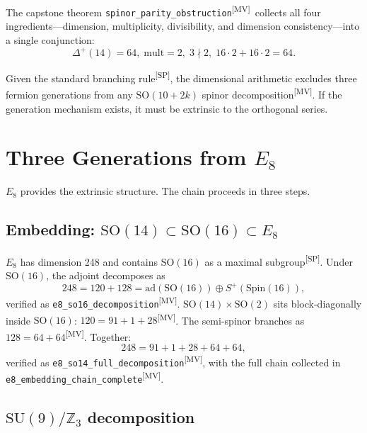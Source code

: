 \documentclass[aps,prl,twocolumn,showpacs,preprintnumbers,superscriptaddress,floatfix]{revtex4-2}
\newcommand{\ad}{\mathrm{ad}}
\newcommand{\MV}{\textsuperscript{[MV]}}
\newcommand{\SP}{\textsuperscript{[SP]}}
\begin{document}
The capstone theorem \texttt{spinor\_parity\_obstruction}\MV\
collects all four ingredients---dimension, multiplicity, divisibility,
and dimension consistency---into a single conjunction:
\begin{equation}
  \Delta^+(14) = 64,\;
  \mathrm{mult} = 2,\;
  3 \nmid 2,\;
  16 \cdot 2 + 16 \cdot 2 = 64.
  \label{eq:capstone-obs}
\end{equation}

Given the standard branching rule\SP, the dimensional arithmetic
excludes three fermion generations from any
$\mathrm{SO}(10{+}2k)$ spinor decomposition\MV.  If the
generation mechanism exists, it must be extrinsic to the
orthogonal series.

\section{Three Generations from $E_8$}
\label{sec:e8}

$E_8$ provides the extrinsic structure.  The chain proceeds in
three steps.

\subsection{Embedding: $\mathrm{SO}(14) \subset \mathrm{SO}(16) \subset E_8$}

$E_8$ has dimension 248 and contains $\mathrm{SO}(16)$ as a
maximal subgroup\SP.  Under $\mathrm{SO}(16)$, the adjoint
decomposes as~\cite{slansky1981}
\begin{equation}
  248 = 120 + 128
  = \ad(\mathrm{SO}(16)) \oplus S^+(\mathrm{Spin}(16)),
  \label{eq:e8-so16}
\end{equation}
verified as \texttt{e8\_so16\_decomposition}\MV.
$\mathrm{SO}(14) \times \mathrm{SO}(2)$ sits block-diagonally
inside $\mathrm{SO}(16)$: $120 = 91 + 1 + 28$\MV.
The semi-spinor branches as $128 = 64 + 64$\MV.  Together:
\begin{equation}
  248 = 91 + 1 + 28 + 64 + 64,
  \label{eq:e8-so14}
\end{equation}
verified as
\texttt{e8\_so14\_full\_decomposition}\MV, with the full chain
collected in \texttt{e8\_embedding\_chain\_complete}\MV.

\subsection{$\mathrm{SU}(9)/\mathbb{Z}_3$ decomposition}
\end{document}
